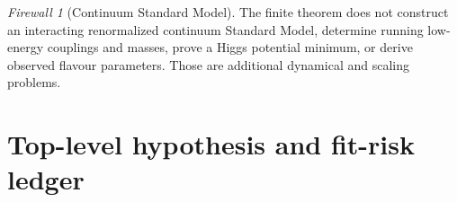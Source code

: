 \documentclass[11pt]{article}
\theoremstyle{definition}
\theoremstyle{remark}
\newtheorem{firewall}[theorem]{Firewall}
\begin{document}
\begin{firewall}[Continuum Standard Model]
The finite theorem does not construct an interacting renormalized continuum
Standard Model, determine running low-energy couplings and masses, prove a
Higgs potential minimum, or derive observed flavour parameters.  Those are
additional dynamical and scaling problems.
\end{firewall}

\section{Top-level hypothesis and fit-risk ledger}
\label{sec:top-level-ledger}
\end{document}
